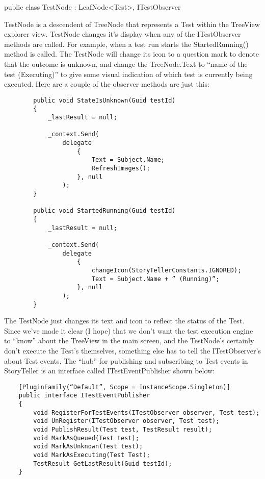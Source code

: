 \documentclass{article}
\begin{document}
{public class TestNode : LeafNode<Test>, ITestObserver

TestNode is a descendent of TreeNode that represents a Test within the TreeView explorer view.  TestNode changes it's display when any of the ITestObserver methods are called.  For example, when a test run starts the StartedRunning() method is called.  The TestNode will change its icon to a question mark to denote that the outcome is unknown, and change the TreeNode.Text to “name of the test (Executing)” to give some visual indication of which test is currently being executed.  Here are a couple of the observer methods are just this:

 \begin{lstlisting}
        public void StateIsUnknown(Guid testId)
        {
            _lastResult = null;
			
            _context.Send(
                delegate
                    {
                        Text = Subject.Name;
                        RefreshImages();
                    }, null
                );
        }

        public void StartedRunning(Guid testId)
        {
            _lastResult = null;

            _context.Send(
                delegate
                    {
                        changeIcon(StoryTellerConstants.IGNORED);
                        Text = Subject.Name + ” (Running)”;
                    }, null
                );
        }
\end{lstlisting}

The TestNode just changes its text and icon to reflect the status of the Test.  Since we've made it clear (I hope) that we don't want the test execution engine to “know” about the TreeView in the main screen, and the TestNode's certainly don't execute the Test's themselves, something else has to tell the ITestObserver's about Test events.  The “hub” for publishing and subscribing to Test events in StoryTeller is an interface called ITestEventPublisher shown below:

 \begin{lstlisting}
    [PluginFamily(“Default”, Scope = InstanceScope.Singleton)]
    public interface ITestEventPublisher
    {
        void RegisterForTestEvents(ITestObserver observer, Test test);
        void UnRegister(ITestObserver observer, Test test);
        void PublishResult(Test test, TestResult result);
        void MarkAsQueued(Test test);
        void MarkAsUnknown(Test test);
        void MarkAsExecuting(Test Test);
        TestResult GetLastResult(Guid testId);
    }
\end{lstlisting}	

}
\end{document}
